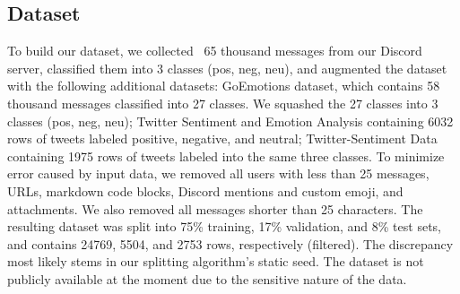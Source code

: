 \documentclass{article}
\begin{document}
\subsection{Dataset}
To build our dataset, we collected ~65 thousand messages from our Discord server, classified them into 3 classes (pos, neg, neu), and augmented the dataset with the following additional datasets: GoEmotions\cite{demszky2020goemotions} dataset, which contains 58 thousand messages classified into 27 classes. We squashed the 27 classes into 3 classes (pos, neg, neu); Twitter Sentiment and Emotion Analysis\cite{Cop_2021} containing 6032 rows of tweets labeled positive, negative, and neutral; Twitter-Sentiment Data\cite{Kumar_2022} containing 1975 rows of tweets labeled into the same three classes. To minimize error caused by input data, we removed all users with less than 25 messages, URLs, markdown code blocks, Discord mentions and custom emoji, and attachments. We also removed all messages shorter than 25 characters. The resulting dataset was split into 75\% training, 17\% validation, and 8\% test sets, and contains 24769, 5504, and 2753 rows, respectively (filtered). The discrepancy most likely stems in our splitting algorithm's static seed. The dataset is not publicly available at the moment due to the sensitive nature of the data.
\end{document}
